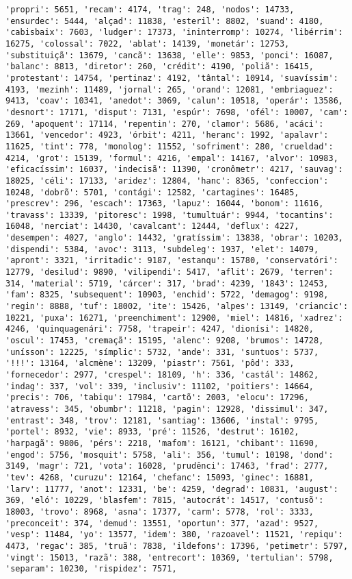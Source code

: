 \documentclass[11pt]{article}
\begin{document}
\begin{Verbatim}[commandchars=\\\{\}]
'propri': 5651, 'recam': 4174, 'trag': 248, 'nodos': 14733, 'ensurdec': 5444, 'alçad': 11838, 'esteril': 8802, 'suand': 4180, 'cabisbaix': 7603, 'ludger': 17373, 'ininterromp': 10274, 'libérrim': 16275, 'colossal': 7022, 'ablat': 14139, 'monetár': 12753, 'substituiçã': 13679, 'cancã': 13638, 'elle': 9853, 'ponci': 16087, 'balanc': 8813, 'diretor': 260, 'crédit': 4190, 'poliã': 16415, 'protestant': 14754, 'pertinaz': 4192, 'tântal': 10914, 'suavíssim': 4193, 'mezinh': 11489, 'jornal': 265, 'orand': 12081, 'embriaguez': 9413, 'coav': 10341, 'anedot': 3069, 'calun': 10518, 'operár': 13586, 'desnort': 17171, 'disput': 7131, 'espúr': 7698, 'ofél': 10007, 'cam': 269, 'apoquent': 17114, 'repentin': 270, 'clamor': 5686, 'acáci': 13661, 'vencedor': 4923, 'órbit': 4211, 'heranc': 1992, 'apalavr': 11625, 'tint': 778, 'monolog': 11552, 'sofriment': 280, 'crueldad': 4214, 'grot': 15139, 'formul': 4216, 'empal': 14167, 'alvor': 10983, 'eficacíssim': 16037, 'indecisã': 11390, 'cronômetr': 4217, 'sauvag': 18025, 'céli': 17133, 'aridez': 12804, 'hanc': 8365, 'confeccion': 10248, 'dobrõ': 5701, 'contági': 12582, 'cartagines': 16485, 'prescrev': 296, 'escach': 17363, 'lapuz': 16044, 'bonom': 11616, 'travass': 13339, 'pitoresc': 1998, 'tumultuár': 9944, 'tocantins': 16048, 'nerciat': 14430, 'cavalcant': 12444, 'deflux': 4227, 'desempen': 4027, 'anglo': 14432, 'gratíssim': 13838, 'obrar': 10203, 'dispendi': 5384, 'avoc': 3113, 'subdeleg': 1937, 'elet': 14079, 'apront': 3321, 'irritadic': 9187, 'estanqu': 15780, 'conservatóri': 12779, 'desilud': 9890, 'vilipendi': 5417, 'aflit': 2679, 'terren': 314, 'material': 5719, 'cárcer': 317, 'brad': 4239, '1843': 12453, 'fam': 8325, 'subsequent': 10903, 'enchid': 5722, 'demagog': 9198, 'regin': 8888, 'tuf': 18002, 'ite': 15426, 'alpes': 13149, 'criancic': 10221, 'puxa': 16271, 'preenchiment': 12900, 'miel': 14816, 'xadrez': 4246, 'quinquagenári': 7758, 'trapeir': 4247, 'dionísi': 14820, 'oscul': 17453, 'cremaçã': 15195, 'alenc': 9208, 'brumos': 14728, 'unísson': 12225, 'símplic': 5732, 'ande': 331, 'suntuos': 5737, '!!!': 13164, 'alcmène': 13209, 'piastr': 7561, 'pôd': 333, 'fornecedor': 2977, 'crespel': 18109, 'h': 336, 'castál': 14862, 'indag': 337, 'vol': 339, 'inclusiv': 11102, 'poitiers': 14664, 'precis': 706, 'tabiqu': 17984, 'cartõ': 2003, 'elocu': 17296, 'atravess': 345, 'obumbr': 11218, 'pagin': 12928, 'dissimul': 347, 'entrast': 348, 'trov': 12181, 'santiag': 13606, 'instal': 9795, 'portel': 8932, 'vie': 8933, 'pré': 11526, 'destrut': 16102, 'harpagã': 9806, 'pérs': 2218, 'mafom': 16121, 'chibant': 11690, 'engod': 5756, 'mosquit': 5758, 'ali': 356, 'tumul': 10198, 'dond': 3149, 'magr': 721, 'vota': 16028, 'prudênci': 17463, 'frad': 2777, 'tev': 4268, 'curuzu': 12164, 'chefanc': 15093, 'ginec': 16881, 'larv': 11777, 'anot': 12331, 'be': 4259, 'degrad': 10831, 'august': 369, 'eló': 10229, 'blasfem': 7815, 'autocrát': 14517, 'contusõ': 18003, 'trovo': 8968, 'asna': 17377, 'carm': 5778, 'rol': 3333, 'preconceit': 374, 'demud': 13551, 'oportun': 377, 'azad': 9527, 'vesp': 11484, 'yo': 13577, 'idem': 380, 'razoavel': 11521, 'repiqu': 4473, 'regac': 385, 'truã': 7838, 'ildefons': 17396, 'petimetr': 5797, 'vingt': 15013, 'razã': 388, 'entrecort': 10369, 'tertulian': 5798, 'separam': 10230, 'rispidez': 7571, 
\end{Verbatim}
\end{document}
